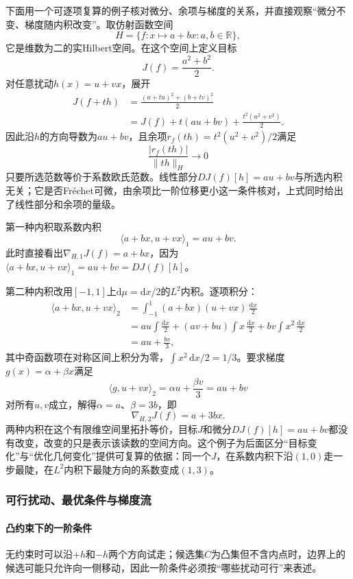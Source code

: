 下面用一个可逐项复算的例子核对微分、余项与梯度的关系，并直接观察“微分不变、梯度随内积改变”。取仿射函数空间
\[
  H=\{f:x\mapsto a+bx:a,b\in\mathbb R\},
\]
它是维数为二的实Hilbert空间。在这个空间上定义目标
\[
  J(f)=\frac{a^2+b^2}{2}.
\]
对任意扰动$h(x)=u+vx$，展开
\[
\begin{aligned}
  J(f+th)
  &=\frac{(a+tu)^2+(b+tv)^2}{2}\\
  &=J(f)+t(au+bv)+\frac{t^2(u^2+v^2)}{2}.
\end{aligned}
\]
因此沿$h$的方向导数为$au+bv$，且余项$r_f(th)=t^2(u^2+v^2)/2$满足
\[
  \frac{|r_f(th)|}{\|th\|_H}\to0
\]
只要所选范数等价于系数欧氏范数。线性部分$DJ(f)[h]=au+bv$与所选内积无关；它是否Fréchet可微，由余项比一阶位移更小这一条件核对，上式同时给出了线性部分和余项的量级。

第一种内积取系数内积
\[
  \langle a+bx,u+vx\rangle_1=au+bv.
\]
此时直接看出$\nabla_{H,1}J(f)=a+bx$，因为$\langle a+bx,u+vx\rangle_1=au+bv=DJ(f)[h]$。

第二种内积改用$[-1,1]$上$\mathrm d\mu=\mathrm dx/2$的$L^2$内积。逐项积分：
\[
\begin{aligned}
  \langle a+bx,u+vx\rangle_2
  &=\int_{-1}^1(a+bx)(u+vx)\,\frac{\mathrm dx}{2}\\
  &=au\int\frac{\mathrm dx}{2}
  +(av+bu)\int x\,\frac{\mathrm dx}{2}
  +bv\int x^2\,\frac{\mathrm dx}{2}\\
  &=au+\frac{bv}{3},
\end{aligned}
\]
其中奇函数项在对称区间上积分为零，$\int x^2\,\mathrm dx/2=1/3$。要求梯度$g(x)=\alpha+\beta x$满足
\[
  \langle g,u+vx\rangle_2=\alpha u+\frac{\beta v}{3}=au+bv
  \]
对所有$u,v$成立，解得$\alpha=a$、$\beta=3b$，即
\[
  \nabla_{H,2}J(f)=a+3bx.
\]
两种内积在这个有限维空间里拓扑等价，目标$J$和微分$DJ(f)[h]=au+bv$都没有改变，改变的只是表示该读数的空间方向。这个例子为后面区分“目标变化”与“优化几何变化”提供可复算的依据：同一个$J$，在系数内积下沿$(1,0)$走一步最陡，在$L^2$内积下最陡方向的系数变成$(1,3)$。

\subsubsection{可行扰动、最优条件与梯度流}
\label{subsubsec:feasible-optimality-flow}

\paragraph{凸约束下的一阶条件}

无约束时可以沿$+h$和$-h$两个方向试走；候选集$C$为凸集但不含内点时，边界上的候选可能只允许向一侧移动，因此一阶条件必须按“哪些扰动可行”来表述。


